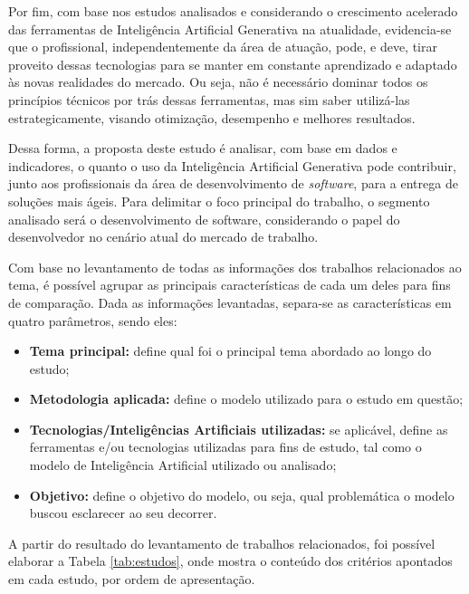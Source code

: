\documentclass[english,brazilian]{UNISINOSartigo} %
\begin{document}
Por fim, com base nos estudos analisados e considerando o crescimento acelerado das ferramentas de Inteligência Artificial Generativa na atualidade, evidencia-se que o profissional, independentemente da área de atuação, pode, e deve, tirar proveito dessas tecnologias para se manter em constante aprendizado e adaptado às novas realidades do mercado. Ou seja, não é necessário dominar todos os princípios técnicos por trás dessas ferramentas, mas sim saber utilizá-las estrategicamente, visando otimização, desempenho e melhores resultados.

Dessa forma, a proposta deste estudo é analisar, com base em dados e indicadores, o quanto o uso da Inteligência Artificial Generativa pode contribuir, junto aos profissionais da área de desenvolvimento de \textit{software}, para a entrega de soluções mais ágeis. Para delimitar o foco principal do trabalho, o segmento analisado será o desenvolvimento de software, considerando o papel do desenvolvedor no cenário atual do mercado de trabalho.

Com base no levantamento de todas as informações dos trabalhos relacionados ao tema, é possível agrupar as principais características de cada um deles para fins de comparação. Dada as informações levantadas, separa-se as características em quatro parâmetros, sendo eles:

\begin{itemize}[leftmargin=1cm, itemsep=0.1em, topsep=0.1em]
    \item  \textbf{Tema principal:} define qual foi o principal tema abordado ao longo do estudo;
    \item \textbf{Metodologia aplicada:} define o modelo utilizado para o estudo em questão;
    \item \textbf{Tecnologias/Inteligências Artificiais utilizadas:} se aplicável, define as ferramentas e/ou tecnologias utilizadas para fins de estudo, tal como o modelo de Inteligência Artificial utilizado ou analisado;
    \item \textbf{Objetivo:} define o objetivo do modelo, ou seja, qual problemática o modelo buscou esclarecer ao seu decorrer.
\end{itemize}

A partir do resultado do levantamento de trabalhos relacionados, foi possível elaborar a Tabela \ref{tab:estudos}, onde mostra o conteúdo dos critérios apontados em cada estudo, por ordem de apresentação.
\end{document}
